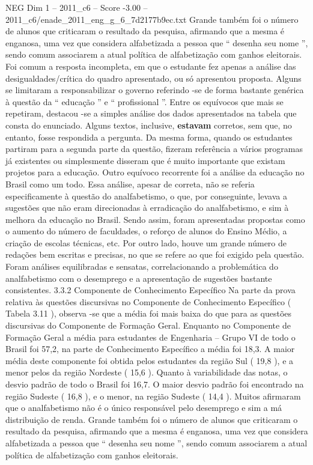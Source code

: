 \begin{textsample}{NEG Dim 1 – 2011\_c6 – Score -3.00 – 2011\_c6/enade\_2011\_eng\_g\_6\_7d2177b9ec.txt}
Grande também foi o número de alunos que criticaram o resultado da pesquisa, afirmando que a mesma é enganosa, uma vez que considera alfabetizada a pessoa que “ desenha seu nome ”, sendo comum associarem a atual política de alfabetização com ganhos eleitorais.
Foi comum a resposta incompleta, em que o estudante fez apenas a análise das desigualdades/crítica do quadro apresentado, ou só apresentou proposta.
Alguns se limitaram a responsabilizar o governo referindo -se de forma bastante genérica à questão da “ educação ” e “ profissional ”.
Entre os equívocos que mais se repetiram, destacou -se a simples análise dos dados apresentados na tabela que consta do enunciado.
Alguns textos, inclusive, \textbf{estavam} corretos, sem que, no entanto, fosse respondida a pergunta.
Da mesma forma, quando os estudantes partiram para a segunda parte da questão, fizeram referência a vários programas já existentes ou simplesmente disseram que é muito importante que existam projetos para a educação.
Outro equívoco recorrente foi a análise da educação no Brasil como um todo.
Essa análise, apesar de correta, não se referia especificamente à questão do analfabetismo, o que, por conseguinte, levava a sugestões que não eram direcionadas à erradicação do analfabetismo, e sim à melhora da educação no Brasil.
Sendo assim, foram apresentadas propostas como o aumento do número de faculdades, o reforço de alunos do Ensino Médio, a criação de escolas técnicas, etc.
Por outro lado, houve um grande número de redações bem escritas e precisas, no que se refere ao que foi exigido pela questão.
Foram análises equilibradas e sensatas, correlacionando a problemática do analfabetismo com o desemprego e a apresentação de sugestões bastante consistentes. 3.3.2 Componente de Conhecimento Específico Na parte da prova relativa às questões discursivas no Componente de Conhecimento Específico ( Tabela 3.11 ), observa -se que a média foi mais baixa do que para as questões discursivas do Componente de Formação Geral.
Enquanto no Componente de Formação Geral a média para estudantes de Engenharia – Grupo VI de todo o Brasil foi 57,2, na parte de Conhecimento Específico a média foi 18,3.
A maior média deste componente foi obtida pelos estudantes da região Sul ( 19,8 ), e a menor pelos da região Nordeste ( 15,6 ).
Quanto à variabilidade das notas, o desvio padrão de todo o Brasil foi 16,7.
O maior desvio padrão foi encontrado na região Sudeste ( 16,8 ), e o menor, na região Sudeste ( 14,4 ).
Muitos afirmaram que o analfabetismo não é o único responsável pelo desemprego e sim a má distribuição de renda.
Grande também foi o número de alunos que criticaram o resultado da pesquisa, afirmando que a mesma é enganosa, uma vez que considera alfabetizada a pessoa que “ desenha seu nome ”, sendo comum associarem a atual política de alfabetização com ganhos eleitorais.

\end{textsample}
